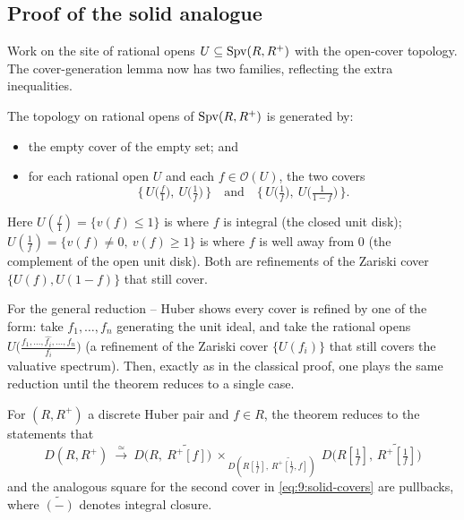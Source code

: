\subsection{Proof of the solid analogue}

Work on the site of rational opens $U\subseteq\operatorname{Spv}(R,R^{+})$ with the open-cover
topology. The cover-generation lemma now has two families, reflecting the extra
inequalities.

\begin{lemma}
\label{lem:9:solid-covers}
The topology on rational opens of $\operatorname{Spv}(R,R^{+})$ is generated by:
\begin{itemize}
\item the empty cover of the empty set; and
\item for each rational open $U$ and each $f\in\mathcal O(U)$, the two covers
\begin{equation}
\label{eq:9:solid-covers}
\bigl\{\,U\bigl(\tfrac{f}{1}\bigr),\ U\bigl(\tfrac1f\bigr)\,\bigr\}\quad\text{and}
\quad\bigl\{\,U\bigl(\tfrac1f\bigr),\ U\bigl(\tfrac1{1-f}\bigr)\,\bigr\}.
\end{equation}
\end{itemize}
Here $U(\tfrac f1)=\{v(f)\le 1\}$ is where $f$ is integral (the closed unit
disk); $U(\tfrac1f)=\{v(f)\neq 0,\ v(f)\ge 1\}$ is where $f$ is well away from
$0$ (the complement of the open unit disk). Both are refinements of the Zariski
cover $\{U(f),U(1-f)\}$ that still cover.
\end{lemma}

For the general reduction -- Huber shows every cover is refined by one of the
form: take $f_{1},\dots,f_{n}$ generating the unit ideal, and take the rational
opens $U\bigl(\tfrac{f_{1},\dots,\widehat{f_{i}},\dots,f_{n}}{f_{i}}\bigr)$
(a refinement of the Zariski cover $\{U(f_{i})\}$ that still covers the valuative
spectrum). Then, exactly as in the classical proof, one plays the same reduction
until the theorem reduces to a single case.

\begin{proposition}
\label{prop:9:solid-squares}
For $(R,R^{+})$ a discrete Huber pair and $f\in R$, the theorem reduces to the
statements that
\begin{equation*}
D(R,R^{+})\ \xrightarrow{\ \simeq\ }\ D\bigl(R,\ \widetilde{R^{+}[f]}\bigr)\
\times_{\,D(R[\frac1f],\,\widetilde{R^{+}[\frac1f,f]})}\ D\bigl(R[\tfrac1f],\,
\widetilde{R^{+}[\tfrac1f]}\bigr)
\end{equation*}
and the analogous square for the second cover in \eqref{eq:9:solid-covers} are
pullbacks, where $\widetilde{(-)}$ denotes integral closure.
\end{proposition}

